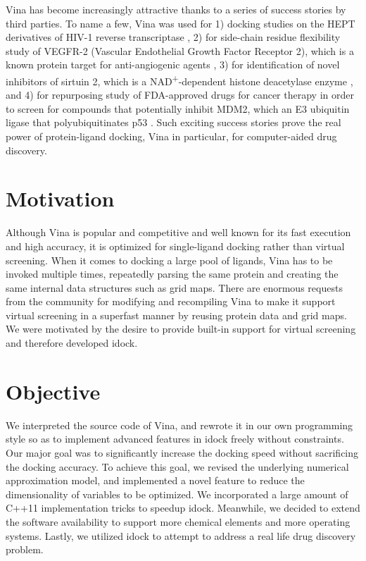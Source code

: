 Vina has become increasingly attractive thanks to a series of success stories by third parties. To name a few, Vina was used for 1) docking studies on the HEPT derivatives of HIV-1 reverse transcriptase \citep{843}, 2) for side-chain residue flexibility study of VEGFR-2 (Vascular Endothelial Growth Factor Receptor 2), which is a known protein target for anti-angiogenic agents \citep{1084}, 3) for identification of novel inhibitors of sirtuin 2, which is a NAD\textsuperscript{+}-dependent histone deacetylase enzyme \citep{1177}, and 4) for repurposing study of FDA-approved drugs for cancer therapy in order to screen for compounds that potentially inhibit MDM2, which an E3 ubiquitin ligase that polyubiquitinates p53 \citep{1230}. Such exciting success stories prove the real power of protein-ligand docking, Vina in particular, for computer-aided drug discovery.

\section{Motivation}

Although Vina is popular and competitive and well known for its fast execution and high accuracy, it is optimized for single-ligand docking rather than virtual screening. When it comes to docking a large pool of ligands, Vina has to be invoked multiple times, repeatedly parsing the same protein and creating the same internal data structures such as grid maps. There are enormous requests from the community for modifying and recompiling Vina to make it support virtual screening in a superfast manner by reusing protein data and grid maps. We were motivated by the desire to provide built-in support for virtual screening and therefore developed idock.

\section{Objective}

We interpreted the source code of Vina, and rewrote it in our own programming style so as to implement advanced features in idock freely without constraints. Our major goal was to significantly increase the docking speed without sacrificing the docking accuracy. To achieve this goal, we revised the underlying numerical approximation model, and implemented a novel feature to reduce the dimensionality of variables to be optimized. We incorporated a large amount of C++11 implementation tricks to speedup idock. Meanwhile, we decided to extend the software availability to support more chemical elements and more operating systems. Lastly, we utilized idock to attempt to address a real life drug discovery problem.


